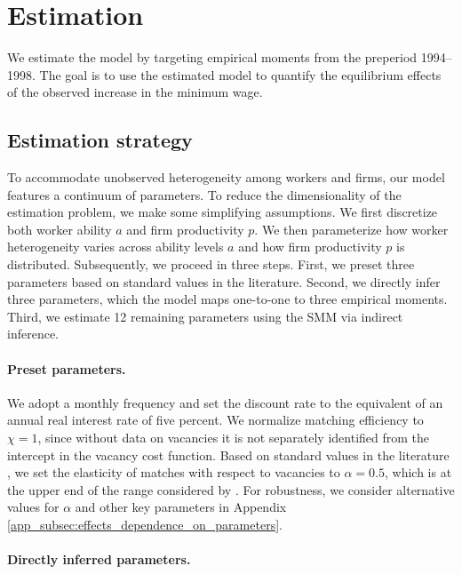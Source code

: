 
\section{Estimation\label{SECTION: Estimation}}

We estimate the model by targeting empirical moments from the preperiod 1994--1998. The goal is to use the estimated model to quantify the equilibrium effects of the observed increase in the minimum wage.

\subsection{Estimation strategy}

To accommodate unobserved heterogeneity among workers and firms, our model features a continuum of parameters. To reduce the dimensionality of the estimation problem, we make some simplifying assumptions. We first discretize both worker ability $a$ and firm productivity $p$. We then parameterize how worker heterogeneity varies across ability levels $a$ and how firm productivity $p$ is distributed. Subsequently, we proceed in three steps. First, we preset three parameters based on standard values in the literature. Second, we directly infer three parameters, which the model maps one-to-one to three empirical moments. Third, we estimate 12 remaining parameters using the SMM via indirect inference.


\paragraph{Preset parameters.}

We adopt a monthly frequency and set the discount rate to the equivalent of an annual real interest rate of five percent. %
%
We normalize matching efficiency to $\chi = 1$, since without data on vacancies it is not separately identified from the intercept in the vacancy cost function. Based on standard values in the literature \citep{petrongolopissarides2001}, we set the elasticity of matches with respect to vacancies to $\alpha=0.5$, which is at the upper end of the range considered by \citet{MeghirNarita2015}. For robustness, we consider alternative values for $\alpha$ and other key parameters in Appendix \ref{app_subsec:effects_dependence_on_parameters}.


\paragraph{Directly inferred parameters.}

